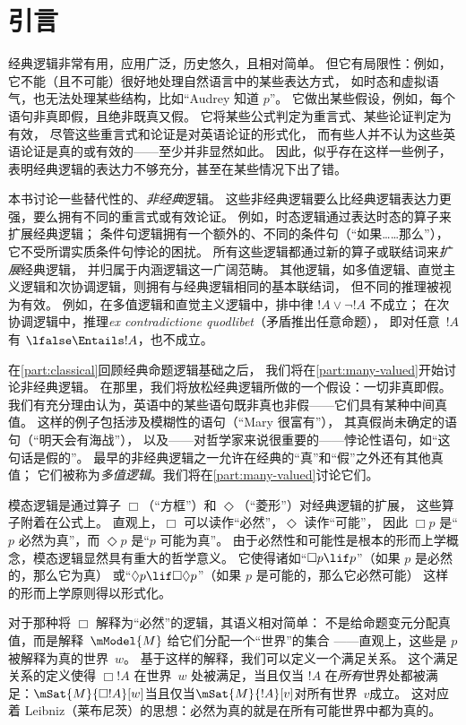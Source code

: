 
\chapter{引言}

经典逻辑非常有用，应用广泛，历史悠久，且相对简单。
但它有局限性：例如，它不能（且不可能）很好地处理自然语言中的某些表达方式，
如时态和虚拟语气，也无法处理某些结构，比如“Audrey 知道 $p$”。
它做出某些假设，例如，每个语句非真即假，且绝非既真又假。
它将某些公式判定为重言式、某些论证判定为有效，
尽管这些重言式和论证是对英语论证的形式化，
而有些人并不认为这些英语论证是真的或有效的——至少并非显然如此。
因此，似乎存在这样一些例子，表明经典逻辑的表达力不够充分，甚至在某些情况下出了错。

本书讨论一些替代性的、\emph{非经典}逻辑。
这些非经典逻辑要么比经典逻辑表达力更强，要么拥有不同的重言式或有效论证。
例如，时态逻辑通过表达时态的算子来扩展经典逻辑；
条件句逻辑拥有一个额外的、不同的条件句（“如果……那么”），
它不受所谓实质条件句悖论的困扰。
所有这些逻辑都通过新的算子或联结词来\emph{扩展}经典逻辑，
并归属于内涵逻辑这一广阔范畴。
其他逻辑，如多值逻辑、直觉主义逻辑和次协调逻辑，则拥有与经典逻辑相同的基本联结词，
但不同的推理被视为有效。
例如，在多值逻辑和直觉主义逻辑中，排中律 $!A \lor \lnot !A$ 不成立；
在次协调逻辑中，推理\emph{ex contradictione quodlibet}（矛盾推出任意命题），
即对任意~$!A$ 有 $\lfalse \Entails !A$，也不成立。

在\cref{part:classical}回顾经典命题逻辑基础之后，
我们将在\ref{part:many-valued}开始讨论非经典逻辑。
在那里，我们将放松经典逻辑所做的一个假设：一切非真即假。
我们有充分理由认为，英语中的某些语句既非真也非假——它们具有某种中间真值。
这样的例子包括涉及模糊性的语句（“Mary 很富有”），
其真假尚未确定的语句（“明天会有海战”），
以及——对哲学家来说很重要的——悖论性语句，如“这句话是假的”。
最早的非经典逻辑之一允许在经典的“真”和“假”之外还有其他真值；
它们被称为\emph{多值逻辑}。我们将在\cref{part:many-valued}讨论它们。

模态逻辑是通过算子 $\Box$（“方框”）和 $\Diamond$（“菱形”）对经典逻辑的扩展，
这些算子附着在公式上。
直观上，$\Box$ 可以读作“必然”，$\Diamond$ 读作“可能”，
因此 $\Box p$ 是“$p$ 必然为真”，而 $\Diamond p$ 是“$p$ 可能为真”。
由于必然性和可能性是根本的形而上学概念，模态逻辑显然具有重大的哲学意义。
它使得诸如“$\Box p \lif p$”（如果 $p$ 是必然的，那么它为真）
或“$\Diamond p \lif \Box\Diamond p$”（如果 $p$ 是可能的，那么它必然可能）
这样的形而上学原则得以形式化。

对于那种将 $\Box$ 解释为“必然”的逻辑，其语义相对简单：
不是给命题变元分配真值，而是解释~$\mModel{M}$ 给它们分配一个“世界”的集合
——直观上，这些是 $p$ 被解释为真的世界~$w$。
基于这样的解释，我们可以定义一个满足关系。
这个满足关系的定义使得 $\Box !A$ 在世界~$w$ 处被满足，当且仅当 $!A$ 在\emph{所有}世界处都被满足：$\mSat{M}{\Box !A}[w]$当且仅当$\mSat{M}{!A}[v]$对所有世界~$v$成立。
这对应着 Leibniz（莱布尼茨）的思想：必然为真的就是在所有可能世界中都为真的。

